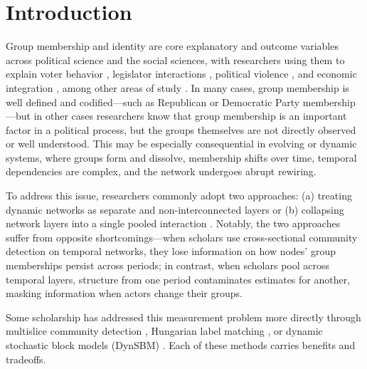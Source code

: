 \documentclass[11pt, letterpaper]{article}
\begin{document}
\newpage
\clearpage
\doublespacing
\newcommand{\best}[1]{\cellcolor{green!15}#1}
\section{Introduction}
Group membership and identity are core explanatory and outcome variables across political science and the social sciences, with researchers using them to explain voter behavior \citep{conevska2026partisan, huddy2015expressive, santoro2023political}, legislator interactions \citep{box_steffensmeier_2019_dear_colleague, Kim_Kunisky_2021}, political violence \citep{cederman2010why, dorff2020Nigeria}, and economic integration \citep{lupu2013trading}, among other areas of study \citep{hafnerburton2009network, renshon2016status}. In many cases, group membership is well defined and codified---such as Republican or Democratic Party membership---but in other cases researchers know that group membership is an important factor in a political process, but the groups themselves are not directly observed or well understood. This may be especially consequential in evolving or dynamic systems, where groups form and dissolve, membership shifts over time, temporal dependencies are complex, and the network undergoes abrupt rewiring.

To address this issue, researchers commonly adopt two approaches: (a) treating dynamic networks as separate and non-interconnected layers \citep{choi2026Jpr, edgerton2026human,lupu2017networked, renshon2016status} or (b) collapsing network layers into a single pooled interaction \citep{bearman2004chains, moody2004structure}. Notably, the two approaches suffer from opposite shortcomings---when scholars use cross-sectional community detection on temporal networks, they lose information on how nodes' group memberships
persist across periods; in contrast, when scholars pool across temporal layers, structure from one period contaminates estimates for another, masking information when actors change their groups.

Some scholarship has addressed this measurement problem more directly through multislice community detection \citep{beardsley2020hierarchy, cranmer2015kantian, mucha2010community}, Hungarian label matching \citep{greene2010tracking, kuhn1955hungarian}, or dynamic stochastic block models (DynSBM) \citep{matias2017statistical,  olivella2022dynamic}. Each of these methods carries benefits and tradeoffs. 
\end{document}
